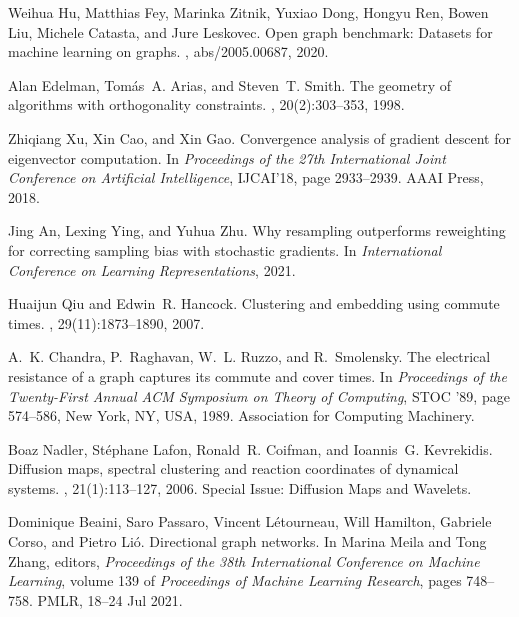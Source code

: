 \documentclass{article}
\theoremstyle{plain}
\theoremstyle{definition}
\begin{document}
{\begin{thebibliography}{10}
Weihua Hu, Matthias Fey, Marinka Zitnik, Yuxiao Dong, Hongyu Ren, Bowen Liu,
  Michele Catasta, and Jure Leskovec.
\newblock Open graph benchmark: Datasets for machine learning on graphs.
, abs/2005.00687, 2020.

Alan Edelman, Tom\'{a}s~A. Arias, and Steven~T. Smith.
\newblock The geometry of algorithms with orthogonality constraints.
,
  20(2):303--353, 1998.

Zhiqiang Xu, Xin Cao, and Xin Gao.
\newblock Convergence analysis of gradient descent for eigenvector computation.
\newblock In {\em Proceedings of the 27th International Joint Conference on
  Artificial Intelligence}, IJCAI'18, page 2933–2939. AAAI Press, 2018.

Jing An, Lexing Ying, and Yuhua Zhu.
\newblock Why resampling outperforms reweighting for correcting sampling bias
  with stochastic gradients.
\newblock In {\em International Conference on Learning Representations}, 2021.

Huaijun Qiu and Edwin~R. Hancock.
\newblock Clustering and embedding using commute times.
,
  29(11):1873--1890, 2007.

A.~K. Chandra, P.~Raghavan, W.~L. Ruzzo, and R.~Smolensky.
\newblock The electrical resistance of a graph captures its commute and cover
  times.
\newblock In {\em Proceedings of the Twenty-First Annual ACM Symposium on
  Theory of Computing}, STOC '89, page 574–586, New York, NY, USA, 1989.
  Association for Computing Machinery.

Boaz Nadler, Stéphane Lafon, Ronald~R. Coifman, and Ioannis~G. Kevrekidis.
\newblock Diffusion maps, spectral clustering and reaction coordinates of
  dynamical systems.
, 21(1):113--127,
  2006.
\newblock Special Issue: Diffusion Maps and Wavelets.

Dominique Beaini, Saro Passaro, Vincent L{\'e}tourneau, Will Hamilton, Gabriele
  Corso, and Pietro Li{\'o}.
\newblock Directional graph networks.
\newblock In Marina Meila and Tong Zhang, editors, {\em Proceedings of the 38th
  International Conference on Machine Learning}, volume 139 of {\em Proceedings
  of Machine Learning Research}, pages 748--758. PMLR, 18--24 Jul 2021.


\end{thebibliography}}
\end{document}
